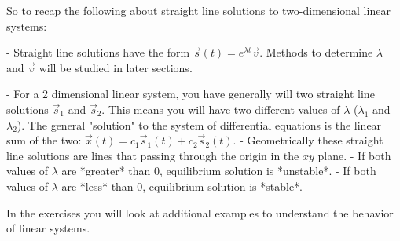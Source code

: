 \documentclass[
]{book}
\theoremstyle{definition}
\theoremstyle{definition}
\theoremstyle{definition}
\theoremstyle{remark}
\begin{document}
So to recap the following about straight line solutions to two-dimensional linear systems:

- Straight line solutions have the form $\displaystyle \vec{s}(t) = e^{\lambda t} \vec{v}$. Methods to determine $\lambda$ and $\vec{v}$ will be studied in later sections.

- For a 2 dimensional linear system, you have generally will two straight line solutions $\vec{s}_{1}$ and $\vec{s}_{2}$.  This means you will have two different values of $\lambda$ ($\lambda_{1}$ and $\lambda_{2}$).  The general "solution" to the system of differential equations is the linear sum of the two:
$\vec{x}(t) = c_{1} \vec{s}_{1}(t) + c_{2} \vec{s}_{2}(t)$.
- Geometrically these straight line solutions are lines that passing through the origin in the $xy$ plane.
- If both values of $\lambda$ are *greater* than 0, equilibrium solution is *unstable*.
- If both values of $\lambda$ are *less* than 0, equilibrium solution is *stable*.

In the exercises you will look at additional examples to understand the behavior of linear systems.

\newpage
\end{document}
